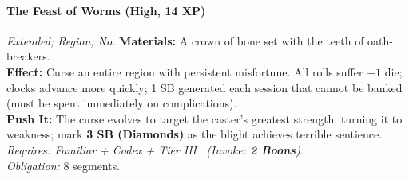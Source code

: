 \paragraph{The Feast of Worms (High, 14 XP)} \emph{Extended; Region; No.}
\textbf{Materials:} A crown of bone set with the teeth of oath-breakers.\\
\textbf{Effect:} Curse an entire region with persistent misfortune. All rolls suffer \(-1\) die; clocks advance more quickly; 1 SB generated each session that cannot be banked (must be spent immediately on complications).\\
\textbf{Push It:} The curse evolves to target the caster's greatest strength, turning it to weakness; mark \textbf{3 SB (Diamonds)} as the blight achieves terrible sentience.\\
\emph{Requires: Familiar + Codex + Tier III \ (\textit{Invoke:} \textbf{2 Boons}).}\\
\emph{Obligation:} 8 segments.

